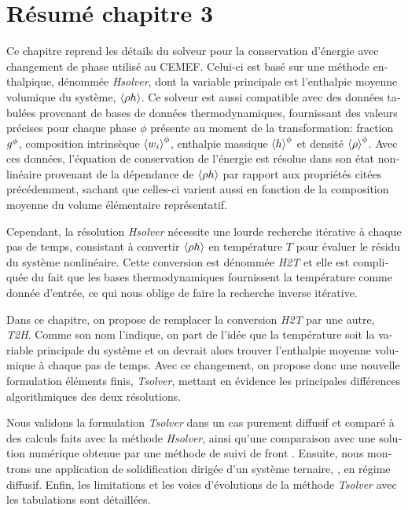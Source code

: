 \clearpage
\section*{Résumé chapitre 3}

\begin{otherlanguage}{french}
{\small

Ce chapitre reprend les détails du solveur pour la conservation d'énergie avec changement de phase utilisé au CEMEF.
Celui-ci est basé sur une méthode enthalpique, dénommée \emph{Hsolver}, dont la variable principale est l'enthalpie
moyenne volumique du système, $\left \langle \rho h \right \rangle$. Ce solveur est aussi compatible avec des données tabulées provenant de bases de données
thermodynamiques, fournissant des valeurs précises pour chaque phase $\phi$ présente au moment de la transformation: 
fraction ${g^{\phi}} $, composition intrinsèque $\left \langle w_i \right \rangle^\phi$, enthalpie massique $\left \langle h \right \rangle^{\phi} $ et densité $\left \langle \rho \right \rangle^{\phi} $. 
Avec ces données, l'équation de conservation de l'énergie est résolue dans son état nonlinéaire 
provenant de la dépendance de $\left \langle \rho h \right \rangle$ par rapport aux propriétés citées précédemment, sachant que celles-ci varient
aussi en fonction de la composition moyenne du volume élémentaire représentatif.


Cependant, la résolution \emph{Hsolver} nécessite une lourde recherche itérative à chaque pas de temps, consistant à convertir
$\left \langle \rho h \right \rangle$ en température $T$ pour évaluer le résidu du système nonlinéaire. Cette conversion est dénommée \emph{H2T} et elle est
compliquée du fait que les bases thermodynamiques fournissent la température comme donnée d'entrée, ce qui nous oblige de faire 
la recherche inverse itérative.


Dans ce chapitre, on propose de remplacer la conversion \emph{H2T} par une autre, \emph{T2H}. Comme son nom l'indique,
on part de l'idée que la température soit la variable principale du système et on devrait alors trouver l'enthalpie moyenne volumique
à chaque pas de temps. Avec ce changement, on propose donc une nouvelle formulation éléments finis, \emph{Tsolver}, mettant en évidence les principales
différences algorithmiques des deux résolutions.


Nous validons la formulation \emph{Tsolver} dans un cas purement diffusif et comparé à des calculs faits avec la méthode \emph{Hsolver}, 
ainsi qu'une comparaison avec une solution numérique obtenue par une méthode de suivi de front \citep{gandin_constrained_2000}.
Ensuite, nous montrons une application de solidification dirigée d'un système ternaire, , en régime diffusif.
Enfin, les limitations et les voies d'évolutions de la méthode \emph{Tsolver} avec les tabulations sont détaillées.

}
\end{otherlanguage}